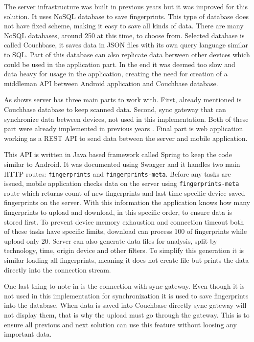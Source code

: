The server infrastructure was built in previous years \cite{IILUBLEB} but it was improved for this solution. It uses NoSQL database to save fingerprints. This type of database does not have fixed scheme, making it easy to save all kinds of data. There are many NoSQL databases, around 250 at this time, to choose from. Selected database is called Couchbase, it saves data in JSON files with its own query language similar to SQL. Part of this database can also replicate data between other devices which could be used in the application part. In the end it was deemed too slow and data heavy for usage in the application, creating the need for creation of a middleman API between Android application and Couchbase database.

As  shows server has three main parts to work with. First, already mentioned is Couchbase database to keep scanned data. Second, sync gateway that can synchronize data between devices, not used in this implementation. Both of these part were already implemented in previous years \cite{IILUBLEB}. Final part is web application working as a REST API to send data between the server and mobile application. 

This API is written in Java based framework called Spring to keep the code similar to Android. It was documented using Swagger and it handles two main HTTP routes: \verb|fingerprints| and  \verb|fingerprints-meta|. Before any tasks are issued, mobile application checks data on the server using \verb|fingerprints-meta| route which returns count of new fingerprints and last time specific device saved fingerprints on the server. With this information the application knows how many fingerprints to upload and download, in this specific order, to ensure data is stored first. To prevent device memory exhaustion and connection timeout both of these tasks have specific limits, download can process 100 of fingerprints while upload only 20. Server can also generate data files for analysis, split by technology, time, origin device and other filters. To simplify this generation it is similar loading all fingerprints, meaning it does not create file but prints the data directly into the connection stream.

One last thing to note in  is the connection with sync gateway. Even though it is not used in this implementation for synchronization it is used to save fingerprints into the database. When data is saved into Couchbase directly sync gateway will not display them, that is why the upload must go through the gateway. This is to ensure all previous and next solution can use this feature without loosing any important data.

